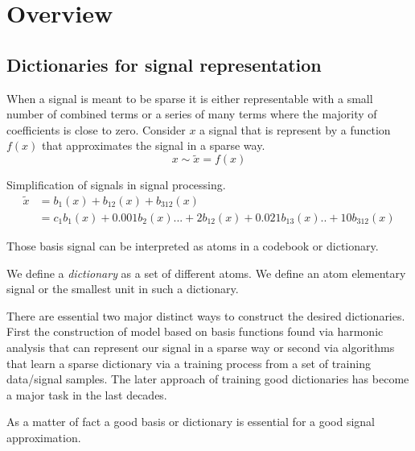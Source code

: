 \chapter{Overview}

\section{Dictionaries for signal representation}

When a signal is meant to be sparse it is either representable with a small
number of combined terms or a series of many terms where the majority of
coefficients is close to zero. Consider $x$ a signal that is represent by a
function $f(x)$ that approximates the signal in a sparse way.
\begin{equation*}
x \sim \tilde{x} = f\left(x\right)
\end{equation*}

Simplification of signals in signal processing.
\begin{equation*}
\begin{split}
\tilde{x} & = b_{1}(x) + b_{12}(x) + b_{312}(x)\\
& = c_{1}b_{1}(x) + 0.001b_{2}(x) ... + 2b_{12}(x) + 0.021b_{13}(x) .. +
10b_{312}(x)
\end{split}
\end{equation*}



Those basis signal can be interpreted as atoms in a codebook or dictionary.

We define a \emph{dictionary} as a set of different atoms. We define an atom
elementary signal or the smallest unit in such a dictionary.

There are essential two major distinct ways to construct the 
desired dictionaries. First the construction of model based on basis functions
found via harmonic analysis that can represent our signal in a sparse way or
second via algorithms that learn a sparse dictionary via a training process from
a set of training data/signal samples. The later approach of training good
dictionaries has become a major task in the last decades\cite{Mairal2010}.

As a matter of fact a good basis or dictionary is essential for a good
signal approximation\cite{}.

